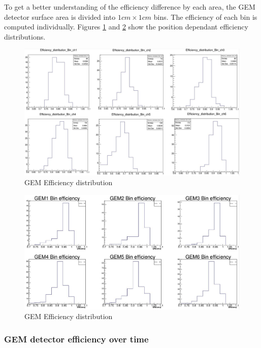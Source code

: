 To get a better understanding of the efficiency difference by each area, the GEM detector surface area is 
divided into  $1cm \times 1cm$ bins. The efficiency of each bin is computed individually. Figures 
\ref{fig:lhrs_gem_bin_efficiency} and \ref{fig:rhrs_gem_bin_efficiency} show the position dependant 
 efficiency distributions.
\begin{figure}[!htbp]
    \centering
    \includegraphics[width=\textwidth]{images/chap5/lhrs_gem_bin_efficiency.png}
    \caption{GEM Efficiency distribution}
    \label{fig:lhrs_gem_bin_efficiency}
\end{figure}

\begin{figure}[!htbp]
    \centering
    \includegraphics[width=\textwidth]{images/chap5/rhrs_gem_bin_efficiency.png}
    \caption{GEM Efficiency distribution}
    \label{fig:rhrs_gem_bin_efficiency}
\end{figure}

\subsubsection{GEM detector efficiency over time}

